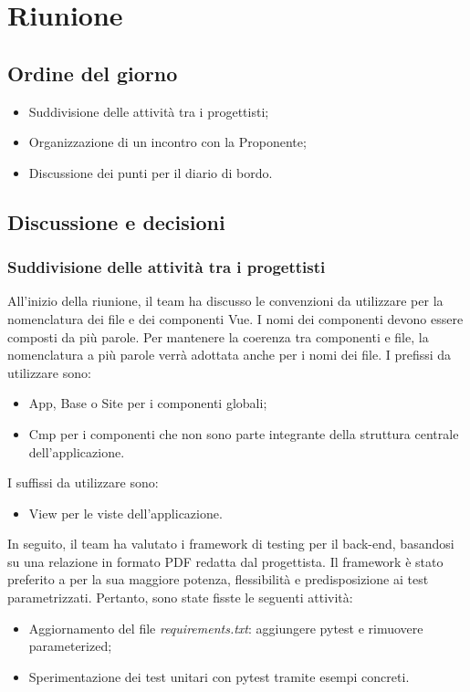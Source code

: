 \section{Riunione}
\subsection{Ordine del giorno}
\begin{itemize}
	\item Suddivisione delle attività tra i progettisti;
	\item Organizzazione di un incontro con la Proponente;
	\item Discussione dei punti per il diario di bordo.
\end{itemize}

\subsection{Discussione e decisioni}
\subsubsection{Suddivisione delle attività tra i progettisti}
\par All'inizio della riunione, il team ha discusso le convenzioni da utilizzare per la nomenclatura dei file e dei componenti Vue. I nomi dei componenti devono essere composti da più parole. Per mantenere la coerenza tra componenti e file, la nomenclatura a più parole verrà adottata anche per i nomi dei file. I prefissi da utilizzare sono:
\begin{itemize}
	\item App, Base o Site per i componenti globali;
	\item Cmp per i componenti che non sono parte integrante della struttura centrale dell'applicazione.
\end{itemize}

\vspace{0.5\baselineskip}
\par I suffissi da utilizzare sono:
\begin{itemize}
	\item View per le viste dell'applicazione.
\end{itemize}

\vspace{0.5\baselineskip}
\par In seguito, il team ha valutato i framework di testing per il back-end, basandosi su una relazione in formato PDF redatta dal progettista. Il framework  è stato preferito a  per la sua maggiore potenza, flessibilità e predisposizione ai test parametrizzati. Pertanto, sono state fisste le seguenti attività:
\begin{itemize}
	\item Aggiornamento del file \textit{requirements.txt}: aggiungere pytest e rimuovere parameterized;
	\item Sperimentazione dei test unitari con pytest tramite esempi concreti.
\end{itemize}


